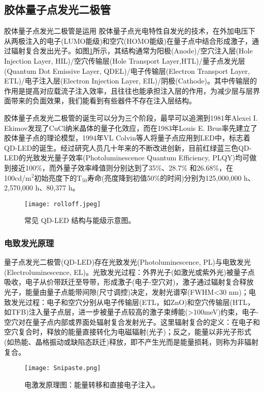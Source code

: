 \subsection{胶体量子点发光二极管}
胶体量子点发光二极管是运用
胶体量子点光电特性自发光的技术，在外加电压下从两极注入的电子(LUMO能级)和空穴(HOMO能级)在量子点中结合形成激子，通过辐射复合发出光子。如图\ref{fig:rolloff}所示，其结构通常为阳极(Anode)/空穴注入层(Hole Injection Layer, HIL)/空穴传输层(Hole Transport Layer,HTL)/量子点发光层(Quantum Dot Emissive Layer, QDEL)/电子传输层(Electron Transport Layer, ETL)/电子注入层(Electron Injection Layer, EIL)/阴极(Cathode)。其中传输层的作用是提高对应载流子注入效率，且往往也能承担注入层的作用，为减少层与层界面带来的负面效果，我们能看到有些器件不存在注入层结构。

胶体量子点发光二极管的诞生可以分为三个阶段，最早可以追溯到1981年Alexei I. Ekimov发现了CuCl纳米晶体的量子化效应\cite{ekimov1985quantum}，而在1983年Louis E. Brus率先建立了胶体量子点的理论模型\cite{brus1984electron}，1994年VL Colvin等人将量子点应用到LED中，标志着QD-LED的诞生\cite{colvin1994light}。经过研究人员几十年来的不断改进创新，目前红绿蓝三色QD-LED的光致发光量子效率(Photoluminescence Quantum Efficiency, PLQY)均可做到接近100\%，而外量子效率峰值则分别达到了35\%\cite{xu2024dipole}、28.7\%\cite{deng2022solution} 和26.68\%\cite{bian2024efficient}，在100cd/m$^2$初始亮度下的T$_{50}$寿命(亮度降到初值50\%的时间)分别为125,000,000 h\cite{lee2022bright}、2,570,000 h\cite{deng2022solution}、80,377 h\cite{chen2023blue}。
\begin{figure}[ht]
	\centering
	\texttt{[image: rolloff.jpeg]}
	\caption{常见 QD-LED 结构与能级示意图\cite{jing2022highly}。}
	\label{fig:rolloff}
\end{figure}
\subsubsection{电致发光原理}
量子点发光二极管(QD-LED)存在光致发光(Photoluminescence, PL)与电致发光(Electroluminescence, EL)。光致发光过程：外界光子(如激光或紫外光)被量子点吸收，电子从价带跃迁至导带，形成激子(电子-空穴对)，激子通过辐射复合释放光子，能量由量子点能带间隙(尺寸调控)决定，发射光谱窄(FWHM<30 nm)；电致发光过程：电子和空穴分别从电子传输层(ETL，如ZnO)和空穴传输层(HTL，如TFB)注入量子点层，进一步被量子点较高的激子束缚能(>100meV)约束，电子-空穴对在量子点内部或界面处辐射复合发射光子。这里辐射复合的定义：在电子和空穴复合时，释放的能量直接转化为电磁辐射(光子)；反之，能量以非光子形式(如热能、晶格振动或缺陷态跃迁)释放，即不产生光而是能量损耗，则称为非辐射复合。
\begin{figure}[ht]
	\centering
	\texttt{[image: Snipaste.png]}
	\caption{电激发原理图\cite{shirasaki2013emergence}：能量转移和直接电子注入。}
	\label{fig:EL}
\end{figure}

